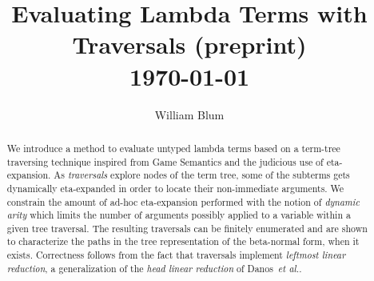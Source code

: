 \documentclass{elsarticle}
\author{William Blum}
\title{Evaluating Lambda Terms with Traversals (preprint)
\\ \vspace*{1em}
\today}
\makeatletter
\theoremstyle{plain}
\theoremstyle{definition}
\theoremstyle{remark}
\def\etal{\textit{et al.}\@\xspace}
\makeatother
\begin{document}





\begin{abstract}
    We introduce a method to evaluate untyped lambda terms based on a term-tree traversing technique inspired from Game Semantics and the judicious use of eta-expansion.
    As \emph{traversals} explore nodes of the term tree,
    some of the subterms gets dynamically eta-expanded in order to locate their non-immediate arguments.
    We constrain the amount of ad-hoc eta-expansion performed with the
    notion of \emph{dynamic arity} which limits the number of arguments possibly applied to a variable within a given tree traversal.
    The resulting traversals can be finitely enumerated and are shown
    to characterize the paths in the tree representation of the beta-normal form, when it exists.
    Correctness follows from the fact that traversals implement \emph{leftmost linear reduction}, a generalization of the \emph{head linear reduction} of Danos~\etal \cite{danos-head,danosherbelinregnier1996}.
\end{abstract}
\end{document}
